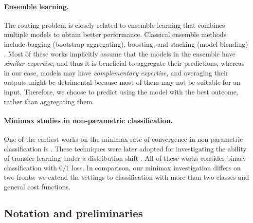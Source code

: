 \paragraph{Ensemble learning.} The routing problem is closely related to ensemble learning that combines multiple models to obtain better performance. Classical ensemble methods include bagging (bootstrap aggregating), boosting, and
stacking (model blending) \citep{breiman1996bagging,breiman1996stacked,freund1996experiments,friedman2001greedy,wolpert1992stacked}. Most of these works implicitly assume that the models in the ensemble have \emph{similar expertise}, and
thus it is beneficial to aggregate their predictions, whereas in our case, models may have \emph{complementary expertise}, and averaging their outputs might be detrimental because most of them may not be suitable for an input. Therefore, we choose to predict using the model with the best outcome, rather than aggregating them. 

\paragraph{Minimax studies in non-parametric classification.} One of the earliest works on the minimax rate of convergence in non-parametric classification is \citet{audibert2007Fast}. These techniques were later adopted for investigating the ability of transfer learning under a distribution shift
\citep{kpotufe2018Marginal,cai2019Transfer,maity2022minimax}. All of these works consider binary classification with $0/1$ loss. In comparison, our minimax investigation differs on two fronts: we extend the settings to classification with more than two classes and general cost functions. 


\subsection{Notation and preliminaries}

